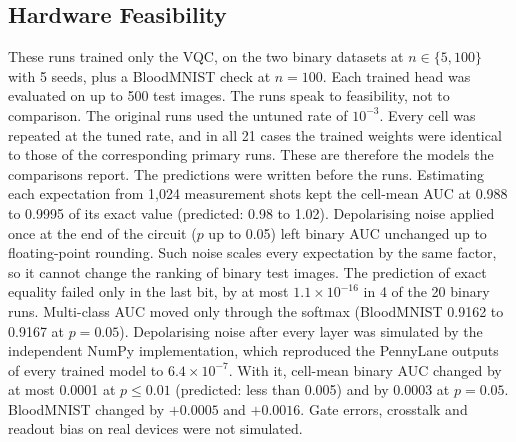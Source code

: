 \documentclass{ieeeaccess}
\newcommand{\vqc}{VQC}
\begin{document}
\subsection{Hardware Feasibility}
\label{sec:hardware}
These runs trained only the \vqc{}, on the two binary datasets at $n\in\{5,100\}$ with 5 seeds, plus a BloodMNIST check at $n=100$. Each trained head was evaluated on up to 500 test images. The runs speak to feasibility, not to comparison. The original runs used the untuned rate of $10^{-3}$. Every cell was repeated at the tuned rate, and in all 21 cases the trained weights were identical to those of the corresponding primary runs. These are therefore the models the comparisons report. The predictions were written before the runs. Estimating each expectation from 1,024 measurement shots kept the cell-mean AUC at 0.988 to 0.9995 of its exact value (predicted: 0.98 to 1.02). Depolarising noise applied once at the end of the circuit ($p$ up to 0.05) left binary AUC unchanged up to floating-point rounding. Such noise scales every expectation by the same factor, so it cannot change the ranking of binary test images. The prediction of exact equality failed only in the last bit, by at most $1.1\times10^{-16}$ in 4 of the 20 binary runs. Multi-class AUC moved only through the softmax (BloodMNIST 0.9162 to 0.9167 at $p=0.05$). Depolarising noise after every layer was simulated by the independent NumPy implementation, which reproduced the PennyLane outputs of every trained model to $6.4\times10^{-7}$. With it, cell-mean binary AUC changed by at most 0.0001 at $p\le0.01$ (predicted: less than 0.005) and by 0.0003 at $p=0.05$. BloodMNIST changed by $+0.0005$ and $+0.0016$. Gate errors, crosstalk and readout bias on real devices were not simulated.
\end{document}

